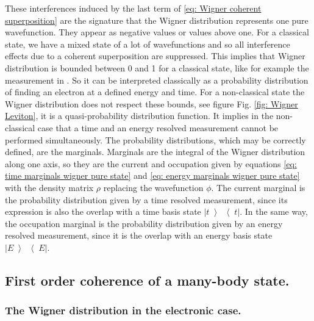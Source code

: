 These interferences induced by the last term of \eqref{eq: Wigner coherent superposition} are the signature that the Wigner distribution represents one pure wavefunction.
They appear as negative values or values above one.
For a classical state, we have a mixed state of a lot of wavefunctions and so all interference effects due to a coherent superposition are suppressed.
This implies that Wigner distribution is bounded between 0 and 1 for a classical state, like for example the measurement in \cite{fletcher2019quantum}.
So it can be interpreted classically as a probability distribution of finding an electron at a defined energy and time.
For a non-classical state the Wigner distribution does not respect these bounds, see figure Fig. \ref{fig: Wigner Leviton}, it is a quasi-probability distribution function.
It implies in the non-classical case that a time and an energy resolved measurement cannot be performed simultaneously.
The probability distributions, which may be correctly defined, are the marginals.
Marginals are the integral of the Wigner distribution along one axis, so they are the current and occupation given by equations \eqref{eq: time marginals wigner pure state} and \eqref{eq: energy marginals wigner pure state} with the density matrix $\rho$ replacing the wavefunction $\phi$.
The current marginal is the probability distribution given by a time resolved measurement, since its expression is also the overlap with a time basis state $\left|t\left>\right<t\right|$.
In the same way, the occupation marginal is the probability distribution given by an energy resolved measurement, since it is the overlap with an energy basis state $\left|E\left>\right<E\right|$.

\subsection{First order coherence of a many-body state.}

\subsubsection*{The Wigner distribution in the electronic case.}

